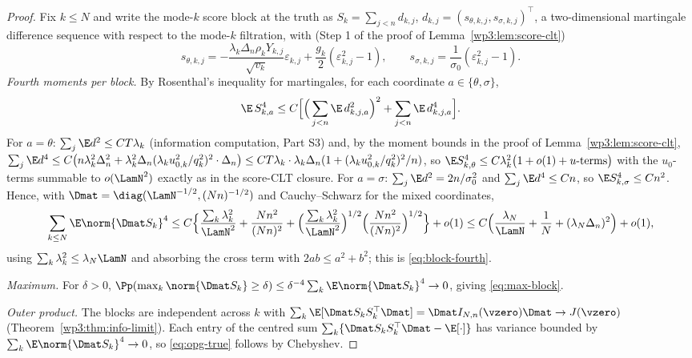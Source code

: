 \closuredraft
\begin{proof}
Fix $k\le N$ and write the mode-$k$ score block at the truth as
$S_{k}=\sum_{j<n}d_{k,j}$, $d_{k,j}=(s_{\theta,k,j},s_{\sigma,k,j})^\top$,
a two-dimensional martingale difference sequence with respect to the mode-$k$
filtration, with (Step 1 of the proof of Lemma~\ref{wp3:lem:score-clt})
\[
 s_{\theta,k,j}
 =-\frac{\lambda_k\Delta_n\rho_kY_{k,j}}{\sqrt{v_k}}\varepsilon_{k,j}
 +\frac{g_k}{2}(\varepsilon^2_{k,j}-1),
 \qquad
 s_{\sigma,k,j}=\frac{1}{\sigma_0}(\varepsilon^2_{k,j}-1).
\]
\emph{Fourth moments per block.} By Rosenthal's inequality for martingales,
for each coordinate $a\in\{\theta,\sigma\}$,
\[
 \E\,S_{k,a}^4
 \le C\Big[\Big(\sum_{j<n}\E\,d_{k,j,a}^2\Big)^2
 +\sum_{j<n}\E\,d_{k,j,a}^4\Big].
\]
For $a=\theta$: $\sum_j\E d^2\le CT\lambda_k$ (information computation,
Part S3) and, by the moment bounds in the proof of Lemma~\ref{wp3:lem:score-clt},
$\sum_j\E d^4\le C\big(n\lambda_k^2\Delta_n^2
+\lambda_k^2\Delta_n(\lambda_ku_{0,k}^2/q_k^2)^2\cdot\Delta_n\big)
\le CT\lambda_k\cdot\lambda_k\Delta_n(1+(\lambda_ku_{0,k}^2/q_k^2)^2/n)$,
so $\E S_{k,\theta}^4\le C\lambda_k^2\big(1+o(1)+u\text{-terms}\big)$ with the
$u_0$-terms summable to $o(\LamN^2)$ exactly as in the score-CLT closure.
For $a=\sigma$: $\sum_j\E d^2=2n/\sigma_0^2$ and $\sum_j\E d^4\le Cn$, so
$\E S_{k,\sigma}^4\le Cn^2$. Hence, with
$\Dmat=\diag(\LamN^{-1/2},(Nn)^{-1/2})$ and Cauchy--Schwarz for the mixed
coordinates,
\[
 \sum_{k\le N}\E\norm{\Dmat S_k}^4
 \le C\Big\{\frac{\sum_k\lambda_k^2}{\LamN^2}
 +\frac{Nn^2}{(Nn)^2}
 +\Big(\frac{\sum_k\lambda_k^2}{\LamN^2}\Big)^{1/2}
 \Big(\frac{Nn^2}{(Nn)^2}\Big)^{1/2}\Big\}+o(1)
 \le C\Big(\frac{\lambda_N}{\LamN}+\frac1N
 +(\lambda_N\Delta_n)^2\Big)+o(1),
\]
using $\sum_k\lambda_k^2\le\lambda_N\LamN$ and absorbing the cross term with
$2ab\le a^2+b^2$; this is \eqref{eq:block-fourth}.

\emph{Maximum.} For $\delta>0$,
$\Pp(\max_k\norm{\Dmat S_k}\ge\delta)
\le\delta^{-4}\sum_k\E\norm{\Dmat S_k}^4\to0$, giving \eqref{eq:max-block}.

\emph{Outer product.} The blocks are independent across $k$ with
$\sum_k\E[\Dmat S_kS_k^\top\Dmat]=\Dmat I_{N,n}(\vzero)\Dmat\to J(\vzero)$
(Theorem~\ref{wp3:thm:info-limit}). Each entry of the centred sum
$\sum_k\{\Dmat S_kS_k^\top\Dmat-\E[\cdot]\}$ has variance bounded by
$\sum_k\E\norm{\Dmat S_k}^4\to0$, so \eqref{eq:opg-true} follows by
Chebyshev.
\end{proof}
